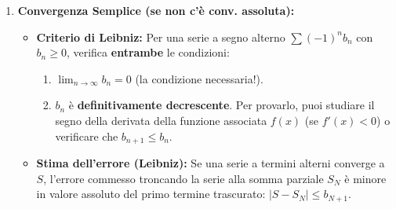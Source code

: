 \documentclass[a4paper, 12pt]{article}
\begin{document}
\begin{enumerate}
    \item \textbf{Convergenza Semplice (se non c'è conv. assoluta):}
    \begin{itemize}
        \item \textbf{Criterio di Leibniz:} Per una serie a segno alterno $\sum (-1)^n b_n$ con $b_n \ge 0$, verifica \textbf{entrambe} le condizioni: 
        \begin{enumerate}
            \item $\lim_{n \to \infty} b_n = 0$ (la condizione necessaria!). 
            \item $b_n$ è \textbf{definitivamente decrescente}. Per provarlo, puoi studiare il segno della derivata della funzione associata $f(x)$ (se $f'(x) < 0$) o verificare che $b_{n+1} \le b_n$. 
        \end{enumerate}
        \item \textbf{Stima dell'errore (Leibniz):} Se una serie a termini alterni converge a $S$, l'errore commesso troncando la serie alla somma parziale $S_N$ è minore in valore assoluto del primo termine trascurato: $|S - S_N| \le b_{N+1}$. 
    \end{itemize}
\end{enumerate}
\end{document}

